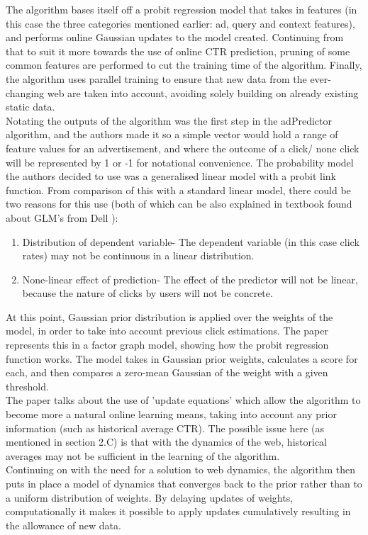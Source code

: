 \documentclass[journal]{IEEEtran}
\begin{document}
The algorithm bases itself off a probit regression model that takes in features (in this case the three categories mentioned earlier: ad, query and context features), and performs online Gaussian updates to the model created. Continuing from that to suit it more towards the use of online CTR prediction, pruning of some common features are performed to cut the training time of the algorithm. Finally, the algorithm uses parallel training to ensure that new data from the ever-changing web are taken into account, avoiding solely building on already existing static data. \\
Notating the outputs of the algorithm was the first step in the adPredictor algorithm, and the authors made it so a simple vector would hold a range of feature values for an advertisement, and where the outcome of a click/ none click will be represented by 1 or -1 for notational convenience. 
The probability model the authors decided to use was a generalised linear model with a probit link function. From comparison of this with a standard linear model, there could be two reasons for this use (both of which can be also explained in textbook found about GLM’s from Dell \cite{dell}):
\begin{enumerate}
\item Distribution of dependent variable- The dependent variable (in this case click rates) may not be continuous in a linear distribution.
\item None-linear effect of prediction- The effect of the predictor will not be linear, because the nature of clicks by users will not be concrete.
\end{enumerate}
At this point, Gaussian prior distribution is applied over the weights of the model, in order to take into account previous click estimations. The paper represents this in a factor graph model, showing how the probit regression function works. The model takes in Gaussian prior weights, calculates a score for each, and then compares a zero-mean Gaussian of the weight with a given threshold. \\
The paper talks about the use of 'update equations' which allow the algorithm to become more a natural online learning means, taking into account any prior information (such as historical average CTR). The possible issue here (as mentioned in section 2.C) is that with the dynamics of the web, historical averages may not be sufficient in the learning of the algorithm. \\
Continuing on with the need for a solution to web dynamics, the algorithm then puts in place a model of dynamics that converges back to the prior rather than to a uniform distribution of weights. By delaying updates of weights, computationally it makes it possible to apply updates cumulatively resulting in the allowance of new data. \\
\end{document}
